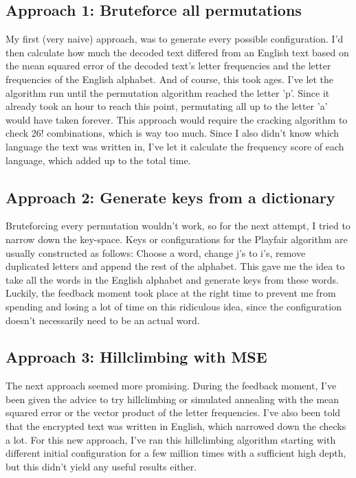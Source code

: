 \documentclass{article}
\begin{document}
\subsection{Approach 1: Bruteforce all permutations}
My first (very naive) approach, was to generate every possible configuration. I'd then calculate how much the decoded text differed from an English text based on the mean squared error of the decoded text's letter frequencies and the letter frequencies of the English alphabet. And of course, this took ages. I've let the algorithm run until the permutation algorithm reached the letter 'p'. Since it already took an hour to reach this point, permutating all up to the letter 'a' would have taken forever. This approach would require the cracking algorithm to check 26! combinations, which is way too much. Since I also didn't know which language the text was written in, I've let it calculate the frequency score of each language, which added up to the total time.

\subsection{Approach 2: Generate keys from a dictionary}
Bruteforcing every permutation wouldn't work, so for the next attempt, I tried to narrow down the key-space. Keys or configurations for the Playfair algorithm are usually constructed as follows: Choose a word, change j's to i's, remove duplicated letters and append the rest of the alphabet. This gave me the idea to take all the words in the English alphabet and generate keys from these words. Luckily, the feedback moment took place at the right time to prevent me from spending and losing a lot of time on this ridiculous idea, since the configuration doesn't necessarily need to be an actual word.

\subsection{Approach 3: Hillclimbing with MSE}
The next approach seemed more promising. During the feedback moment, I've been given the advice to try hillclimbing or simulated annealing with the mean squared error or the vector product of the letter frequencies. I've also been told that the encrypted text was written in English, which narrowed down the checks a lot. For this new approach, I've ran this hillclimbing algorithm starting with different initial configuration for a few million times with a sufficient high depth, but this didn't yield any useful results either.
\end{document}
